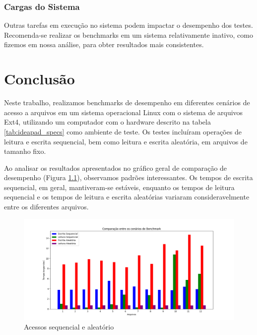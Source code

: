 \documentclass[
	12pt,				%
	openright,			%
	oneside,			%
	a4paper,			%
	chapter=TITLE,		%
	english,			%
	french,				%
	spanish,			%
	brazil				%
	]{abntex2}
\theoremstyle{definition}
\begin{document}


\subsection{Cargas do Sistema}

Outras tarefas em execução no sistema podem impactar o desempenho dos 
testes. Recomenda-se realizar os benchmarks em um sistema relativamente 
inativo, como fizemos em nossa análise, para obter resultados mais consistentes.

\chapter{Conclusão}

Neste trabalho, realizamos benchmarks de desempenho em diferentes cenários 
de acesso a arquivos em um sistema operacional Linux com o sistema de arquivos Ext4, 
utilizando um computador com o hardware descrito na tabela \ref{tab:ideapad_specs}  
como ambiente de teste. Os testes incluíram operações de leitura e escrita 
sequencial, bem como leitura e escrita aleatória, em arquivos de tamanho fixo.

Ao analisar os resultados apresentados no gráfico geral de comparação de desempenho 
(Figura \ref{fig:oneforall}), observamos padrões interessantes. Os tempos de 
escrita sequencial, em geral, mantiveram-se estáveis, enquanto os tempos de 
leitura sequencial e os tempos de leitura e escrita aleatórias variaram 
consideravelmente entre os diferentes arquivos.

\begin{figure}[H]
	\centering
	\includegraphics[width=1.0\textwidth]{oneforall_grafico.png}
	\caption{Acessos sequencial e aleatório}
	\label{fig:oneforall}
\end{figure}
\end{document}
